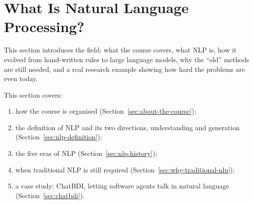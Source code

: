\section{What Is Natural Language Processing?}
\label{sec:introduction-to-nlp}

This section introduces the field: what the course covers, what NLP is, how it evolved
from hand-written rules to large language models, why the ``old'' methods are still
needed, and a real research example showing how hard the problems are even today.

This section covers:
\begin{enumerate}[nosep]
  \item how the course is organised (Section~\ref{sec:about-the-course});
  \item the definition of NLP and its two directions, understanding and generation
        (Section~\ref{sec:nlp-definition});
  \item the five eras of NLP (Section~\ref{sec:nlp-history});
  \item when traditional NLP is still required (Section~\ref{sec:why-traditional-nlp});
  \item a case study: ChatBDI, letting software agents talk in natural language
        (Section~\ref{sec:chatbdi}).
\end{enumerate}






